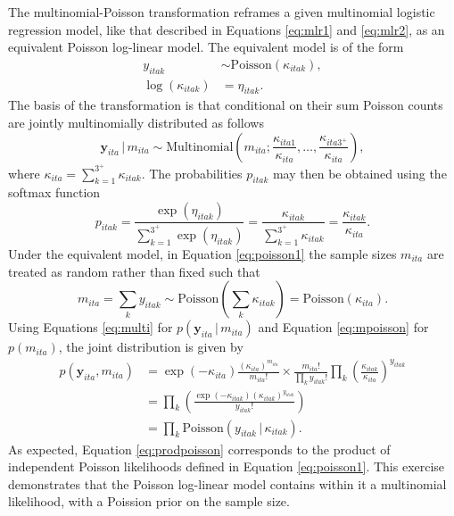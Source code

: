 \documentclass[a4paper, nobind]{templates/ociamthesis}
\begin{document}
The multinomial-Poisson transformation \autocite{baker1994multinomial} reframes a given multinomial logistic regression model, like that described in Equations \eqref{eq:mlr1} and \eqref{eq:mlr2}, as an equivalent Poisson log-linear model.
The equivalent model is of the form
\begin{align}
    y_{itak} &\sim \text{Poisson}(\kappa_{itak}), \label{eq:poisson1} \\
    \log(\kappa_{itak}) &= \eta_{itak}. \label{eq:poisson2}
\end{align}
The basis of the transformation is that conditional on their sum Poisson counts are jointly multinomially distributed \autocite{mccullagh1989generalized} as follows
\begin{equation}
    \mathbf{y}_{ita} \, | \, m_{ita} \sim \text{Multinomial} \left( m_{ita}; \frac{\kappa_{ita1}}{\kappa_{ita}}, \ldots, \frac{\kappa_{ita3^{+}}}{\kappa_{ita}} \right), \label{eq:multi}
\end{equation}
where \(\kappa_{ita} = \sum_{k = 1}^{3^{+}} \kappa_{itak}\).
The probabilities \(p_{itak}\) may then be obtained using the softmax function
\begin{equation}
    p_{itak} = \frac{\exp(\eta_{itak})}{\sum_{k = 1}^{3^{+}} \exp(\eta_{itak})} = \frac{\kappa_{itak}}{\sum_{k = 1}^{3^{+}} \kappa_{itak}} = \frac{\kappa_{itak}}{\kappa_{ita}}.
\end{equation}
Under the equivalent model, in Equation \eqref{eq:poisson1} the sample sizes \(m_{ita}\) are treated as random rather than fixed such that
\begin{equation}
m_{ita} = \sum_k y_{itak} \sim \text{Poisson} \left( \sum_k \kappa_{itak} \right) = \text{Poisson} \left( \kappa_{ita} \right). \label{eq:mpoisson}
\end{equation}
Using Equations \eqref{eq:multi} for \(p(\mathbf{y}_{ita} \, | \, m_{ita})\) and Equation \eqref{eq:mpoisson} for \(p(m_{ita})\), the joint distribution is given by
\begin{align}
p(\mathbf{y}_{ita}, m_{ita}) &= \exp(-\kappa_{ita}) \frac{(\kappa_{ita})^{m_{ita}}}{m_{ita}!} \times \frac{m_{ita}!}{\prod_k y_{itak}!} \prod_k \left( \frac{\kappa_{itak}}{\kappa_{ita}} \right)^{y_{itak}} \\
&= \prod_k \left( \frac{\exp(-\kappa_{itak}) \left( \kappa_{itak} \right)^{y_{itak}}}{y_{itak}!} \right) \\
&= \prod_k \text{Poisson} \left( y_{itak} \, | \, \kappa_{itak} \right). \label{eq:prodpoisson}
\end{align}
As expected, Equation \eqref{eq:prodpoisson} corresponds to the product of independent Poisson likelihoods defined in Equation \eqref{eq:poisson1}.
This exercise demonstrates that the Poisson log-linear model contains within it a multinomial likelihood, with a Poission prior on the sample size.
\end{document}
